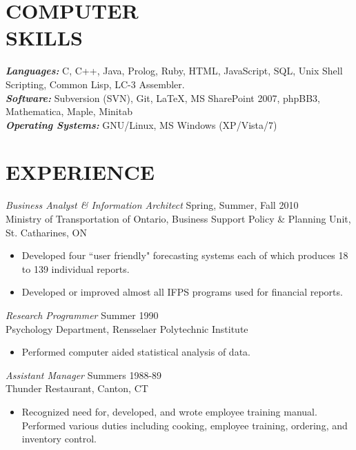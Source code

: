 \documentclass[margin]{res}
\begin{document}
\begin{resume}
\section{COMPUTER \\ SKILLS}
	{\sl \textbf{Languages:}} C, C++, Java, Prolog, Ruby, HTML,
	JavaScript, SQL, Unix Shell Scripting, Common Lisp, LC-3 Assembler. \\
	{\sl \textbf{Software:}} Subversion (SVN), Git, LaTeX,
	MS SharePoint 2007, phpBB3, Mathematica, Maple, Minitab \\
	{\sl \textbf{Operating Systems:}} GNU/Linux, MS Windows (XP/Vista/7)
 
\section{EXPERIENCE}
	{\sl Business Analyst \& Information Architect} \hfill Spring, Summer, Fall 2010 \\
    Ministry of Transportation of Ontario,
    Business Support Policy \& Planning Unit, St. Catharines, ON 
	\begin{itemize}  \itemsep -2pt %
    \item Developed four ``user friendly" forecasting systems each of
    which produces 18 to 139 individual reports. 
    \item Developed or improved almost all IFPS programs used for financial reports.
	\end{itemize}
	
	{\sl Research Programmer} \hfill Summer 1990 \\
    Psychology Department, Rensselaer Polytechnic Institute 
	\begin{itemize}  \itemsep -2pt %
    \item Performed computer aided statistical analysis of data. 
    \end{itemize} 
        
	{\sl Assistant Manager} \hfill Summers 1988-89 \\
    Thunder Restaurant, Canton, CT
	\begin{itemize}
    \item Recognized need for, developed, and wrote employee training manual.
    Performed various duties including cooking, employee training, ordering, and inventory control.
	\end{itemize} 
 

\end{resume}
\end{document}
